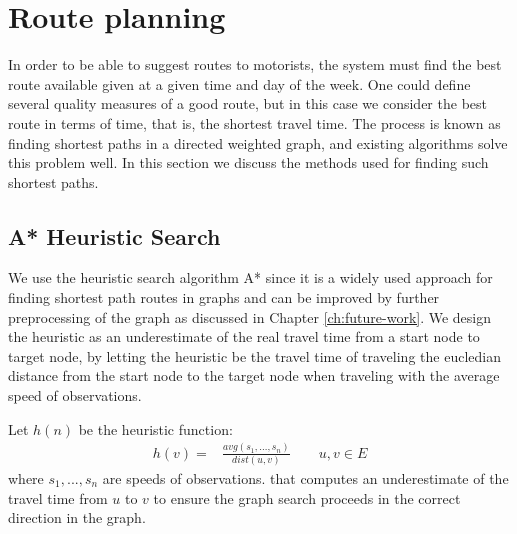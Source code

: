 \section{Route planning}
In order to be able to suggest routes to motorists, the system must find the best route available given at a given time and day of the week. One could define several quality measures of a good route, but in this case we consider the best route in terms of time, that is, the shortest travel time. The process is known as finding shortest paths in a directed weighted graph, and existing algorithms solve this problem well. In this section we discuss the methods used for finding such shortest paths.

\subsection{A* Heuristic Search}\label{sec:pathfinding}
We use the heuristic search algorithm A* since it is a widely used approach for finding shortest path routes in graphs and can be improved by further preprocessing of the graph as discussed in Chapter \ref{ch:future-work}.
We design the heuristic as an underestimate of the real travel time from a start node to target node, by letting the heuristic be the travel time of traveling the eucledian distance from the start node to the target node when traveling with the average speed of observations. 

Let $h(n)$ be the heuristic function:
\begin{align*}
h(v) = &\frac{avg(s_1,…,s_n)}{dist(u,v)} \qquad u,v \in E
\end{align*}
where $s_1,...,s_n$ are speeds of observations.
that computes an underestimate of the travel time from $u$ to $v$ to ensure the graph search proceeds in the correct direction in the graph.

